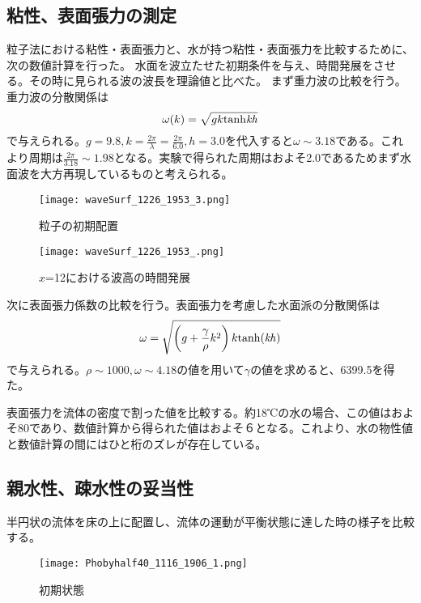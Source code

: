\documentclass[]{jsarticle}
\begin{document}
\subsection{粘性、表面張力の測定}
粒子法における粘性・表面張力と、水が持つ粘性・表面張力を比較するために、次の数値計算を行った。
水面を波立たせた初期条件を与え、時間発展をさせる。その時に見られる波の波長を理論値と比べた。
まず重力波の比較を行う。重力波の分散関係は
\begin{equation}
  \omega(k)=\sqrt{gk\rm{tanh}\it{kh}}
\end{equation}
で与えられる\cite{tatsumiKiso}。$g=9.8, k=\frac{2\pi}{\lambda}=\frac{2\pi}{6.0}, h=3.0$を代入すると$\omega\sim3.18$である。これより周期は$\frac{2\pi}{3.18}\sim1.98$となる。実験で得られた周期はおよそ2.0であるためまず水面波を大方再現しているものと考えられる。
\begin{figure}[H]
  \centering
  \texttt{[image: waveSurf\_1226\_1953\_3.png]}
  \caption{粒子の初期配置}
  \label{fig:waveSurfInit}
\end{figure}
\begin{figure}[H]
  \centering
  \texttt{[image: waveSurf\_1226\_1953\_.png]}
  \caption{$x$=12における波高の時間発展}
  \label{fig:waveSurfEvol}
\end{figure}


次に表面張力係数の比較を行う。表面張力を考慮した水面派の分散関係は
\begin{equation}
\omega=\sqrt{\left(g+\frac{\gamma}{\rho}k^2 \right)k\rm{tanh}(\it{kh})}
\end{equation}
で与えられる\cite{tatsumiKiso}。$\rho\sim1000, \omega\sim4.18$の値を用いて$\gamma$の値を求めると、6399.5を得た。

表面張力を流体の密度で割った値を比較する。約18℃の水の場合、この値はおよそ80であり、数値計算から得られた値はおよそ６となる。これより、水の物性値と数値計算の間にはひと桁のズレが存在している。


\subsection{親水性、疎水性の妥当性}


半円状の流体を床の上に配置し、流体の運動が平衡状態に達した時の様子を比較する。
\begin{figure}[H]
  \centering
  \texttt{[image: Phobyhalf40\_1116\_1906\_1.png]}
  \caption{初期状態}
  \label{fig:contactInitial}
\end{figure}
\end{document}
